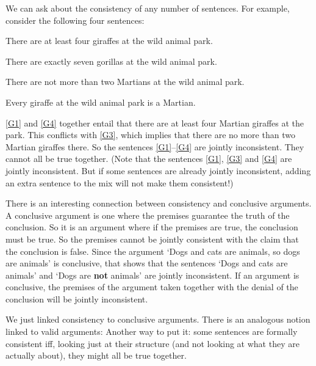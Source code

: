 We can ask about the consistency of any number of sentences. For example, consider the following four sentences:
	\label{MartianGiraffes}
	\begin{earg}
		\item[\ex{G1}] There are at least four giraffes at the wild animal park.
		\item[\ex{G2}] There are exactly seven gorillas at the wild animal park.
		\item[\ex{G3}] There are not more than two Martians at the wild animal park.
		\item[\ex{G4}] Every giraffe at the wild animal park is a Martian.
	\end{earg}
\ref{G1} and \ref{G4} together entail that there are at least four Martian giraffes at the park. This conflicts with \ref{G3}, which implies that there are no more than two Martian giraffes there. So the sentences \ref{G1}–\ref{G4} are jointly inconsistent. They cannot all be true together. (Note that the sentences \ref{G1}, \ref{G3} and \ref{G4} are jointly inconsistent. But if some sentences are already jointly inconsistent, adding an extra sentence to the mix will not make them consistent!)

There is an interesting connection between consistency and conclusive arguments. A conclusive argument is one where the premises guarantee the truth of the conclusion. So it is an argument where if the premises are true, the conclusion must be true. So the premises cannot be jointly consistent with the claim that the conclusion is false. Since the argument `Dogs and cats are animals, so dogs are animals' is conclusive, that shows that the sentences `Dogs and cats are animals' and `Dogs are \textbf{not} animals' are jointly inconsistent. If an argument is conclusive, the premises of the argument taken together with the denial of the conclusion will be jointly inconsistent.

We just linked consistency to conclusive arguments. There is an analogous notion linked to valid arguments: 
Another way to put it: some sentences are formally consistent iff, looking just at their structure (and not looking at what they are actually about), they might all be true together.

